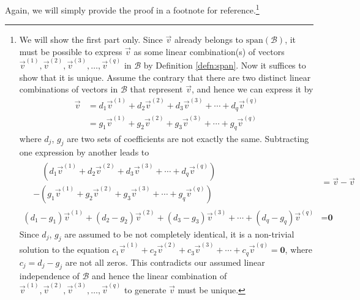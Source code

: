 Again, we will simply provide the proof in a footnote for reference.\footnote{We will show the first part only. Since $\vec{v}$ already belongs to $\text{span}(\mathcal{B})$, it must be possible to express $\vec{v}$ as some linear combination(s) of vectors $\vec{v}^{(1)}, \vec{v}^{(2)}, \vec{v}^{(3)}, \ldots, \vec{v}^{(q)}$ in $\mathcal{B}$ by Definition \ref{defn:span}. Now it suffices to show that it is unique. Assume the contrary that there are two distinct linear combinations of vectors in $\mathcal{B}$ that represent $\vec{v}$, and hence we can express it by
\begin{align*}
\vec{v} &= d_1\vec{v}^{(1)} + d_2\vec{v}^{(2)} + d_3\vec{v}^{(3)} + \cdots + d_q\vec{v}^{(q)} \\
&= g_1\vec{v}^{(1)} + g_2\vec{v}^{(2)} + g_3\vec{v}^{(3)} + \cdots + g_q\vec{v}^{(q)}
\end{align*}
where $d_j$, $g_j$ are two sets of coefficients are not exactly the same. Subtracting one expression by another leads to
\begin{align*}
\begin{aligned}
&\quad (d_1\vec{v}^{(1)} + d_2\vec{v}^{(2)} + d_3\vec{v}^{(3)} + \cdots + d_q\vec{v}^{(q)}) \\
& -(g_1\vec{v}^{(1)} + g_2\vec{v}^{(2)} + g_3\vec{v}^{(3)} + \cdots + g_q\vec{v}^{(q)})
\end{aligned}
&= \vec{v} - \vec{v} \\
(d_1 - g_1)\vec{v}^{(1)} + (d_2 - g_2)\vec{v}^{(2)} + (d_3 - g_3)\vec{v}^{(3)} + \cdots + (d_q - g_q)\vec{v}^{(q)} &= \textbf{0} 
\end{align*}
Since $d_j$, $g_j$ are assumed to be not completely identical, it is a non-trivial solution to the equation $c_1\vec{v}^{(1)} + c_2\vec{v}^{(2)} + c_3\vec{v}^{(3)} + \cdots + c_q\vec{v}^{(q)} = \textbf{0}$, where $c_j = d_j - g_j$ are not all zeros. This contradicts our assumed linear independence of $\mathcal{B}$ and hence the linear combination of $\vec{v}^{(1)}, \vec{v}^{(2)}, \vec{v}^{(3)}, \ldots, \vec{v}^{(q)}$ to generate $\vec{v}$ must be unique.}
